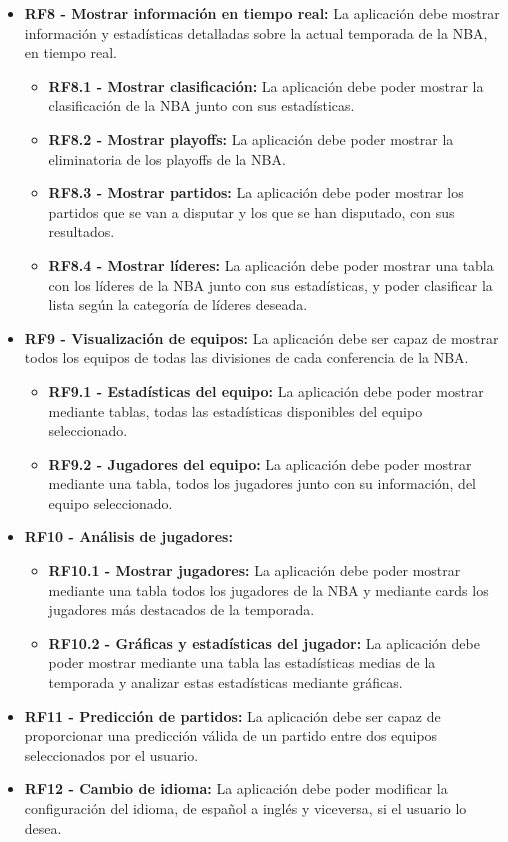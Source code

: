 \begin{itemize}
    \item \textbf{RF8 - Mostrar información en tiempo real:} La aplicación debe mostrar información y estadísticas detalladas sobre la actual temporada de la NBA, en tiempo real.
        \begin{itemize}
        \tightlist
            \item \textbf{RF8.1 - Mostrar clasificación:} La aplicación debe poder mostrar la clasificación de la NBA junto con sus estadísticas.
            \item \textbf{RF8.2 - Mostrar playoffs:} La aplicación debe poder mostrar la eliminatoria de los playoffs de la NBA.
            \item \textbf{RF8.3 - Mostrar partidos:} La aplicación debe poder mostrar los partidos que se van a disputar y los que se han disputado, con sus resultados.
            \item \textbf{RF8.4 - Mostrar líderes:} La aplicación debe poder mostrar una tabla con los líderes de la NBA junto con sus estadísticas, y poder clasificar la lista según la categoría de líderes deseada.
        \end{itemize}
    \item \textbf{RF9 - Visualización de equipos:} La aplicación debe ser capaz de mostrar todos los equipos de todas las divisiones de cada conferencia de la NBA.
        \begin{itemize}
        \tightlist
            \item \textbf{RF9.1 - Estadísticas del equipo:} La aplicación debe poder mostrar mediante tablas, todas las estadísticas disponibles del equipo seleccionado.
            \item \textbf{RF9.2 - Jugadores del equipo:} La aplicación debe poder mostrar mediante una tabla, todos los jugadores junto con su información, del equipo seleccionado.
        \end{itemize}
    \item \textbf{RF10 - Análisis de jugadores:}
        \begin{itemize}
        \tightlist
            \item \textbf{RF10.1 - Mostrar jugadores:} La aplicación debe poder mostrar mediante una tabla todos los jugadores de la NBA y mediante cards los jugadores más destacados de la temporada.
            \item \textbf{RF10.2 - Gráficas y estadísticas del jugador:} La aplicación debe poder mostrar mediante una tabla las estadísticas medias de la temporada y analizar estas estadísticas mediante gráficas.
        \end{itemize}
    \item \textbf{RF11 - Predicción de partidos:} La aplicación debe ser capaz de proporcionar una predicción válida de un partido entre dos equipos seleccionados por el usuario.
    \item \textbf{RF12 - Cambio de idioma:} La aplicación debe poder modificar la configuración del idioma, de español a inglés y viceversa, si el usuario lo desea.
\end{itemize}

